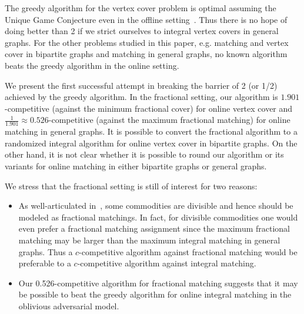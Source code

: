 \documentclass{article}
\begin{document}
The greedy algorithm for the vertex cover problem is optimal assuming the Unique Game Conjecture even in the offline setting~\cite{Khot2008}. Thus there is no hope of doing better than 2 if we strict ourselves to integral vertex covers in general graphs.  For the other problems studied in this paper, e.g. matching and vertex cover in bipartite graphs and matching in general graphs, no known algorithm beats the greedy algorithm in the online setting.

We present the first successful attempt in breaking the barrier of 2 (or 1/2) achieved by the greedy algorithm. In the fractional setting, our algorithm is $1.901$-competitive (against the minimum fractional cover) for online vertex cover and $\frac{1}{1.901}\approx 0.526$-competitive (against the maximum fractional matching) for online matching in general graphs. It is possible to convert the fractional algorithm to a randomized integral algorithm for online vertex cover in bipartite graphs. On the other hand, it is not clear whether it is possible to round our algorithm or its variants for online matching in either bipartite graphs or general graphs.

We stress that the fractional setting is still of interest for two reasons:

\begin{itemize}
\item As well-articulated in~\cite{Buchbinder2007}, some commodities are divisible and hence should be modeled as fractional matchings. In fact, for divisible commodities one would even prefer a fractional matching assignment since the maximum fractional matching may be larger than the maximum integral matching in general graphs. Thus a $c$-competitive algorithm against fractional matching would be preferable to a $c$-competitive algorithm against integral matching.
\item Our 0.526-competitive algorithm for fractional matching suggests that it may be possible to beat the greedy algorithm for online integral matching in the oblivious adversarial model.
\end{itemize}

%
%
\end{document}
